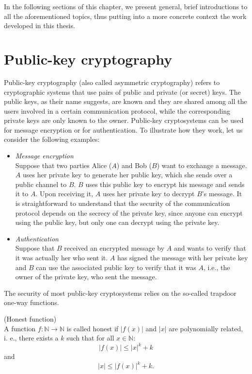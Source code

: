 In the following sections of this chapter, we present general, brief introductions to all the aforementioned topics, thus putting into a more concrete context the work developed in this thesis.  
\section{Public-key cryptography}
 
Public-key cryptography (also called asymmetric cryptography) refers to cryptographic systems that use pairs of public and private (or secret) keys. The public keys, as their name suggests, are known and they are shared among all the users involved in a certain communication protocol, while the corresponding private keys are only known to the owner. 
Public-key cryptosystems can be used for message encryption or for authentication. To illustrate how they work, let us consider the following examples:
\begin{itemize}
\item \textit{Message encryption}\\
Suppose that two parties Alice ($A$) and  Bob ($B$) want to exchange a message. $A$ uses her private key to generate her public key, which she sends over a public channel to $B$. $B$ uses this public key to encrypt his message and sends it to $A$. Upon receiving it, $A$ uses her private key to decrypt $B$'s message. It is straightforward to understand that the security of the communication protocol depends on the secrecy of the private key, since anyone can encrypt using the public key, but only one can decrypt using the private key.  

\item \textit{Authentication}\\
Suppose that $B$ received an encrypted message by $A$ and wants to verify that it was actually her who sent it. $A$ has signed the message with her private key and $B$ can use the associated public key to verify that it was $A$, i.e., the owner of the private key, who sent the message.
\end{itemize}
The security of most public-key cryptosystems relies on the so-called trapdoor one-way functions. 

\begin{definition} (Honest function)\\
	A function $f:\mathbb{N}\rightarrow \mathbb{N}$ is called honest if $|f(x)|$ and $|x|$ are polynomially related, i. e., there exists a $k$ such that for all $x\in\mathbb{N}$:
	$$|f(x)|\leq |x|^k +k$$ and $$|x|\leq |f(x)|^k +k.$$
\end{definition}

